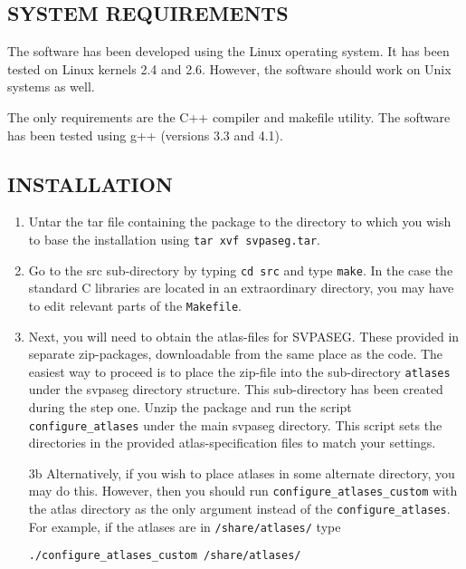 \documentclass[12pt]{article}
\begin{document}
\subsection{SYSTEM REQUIREMENTS}

The software has been developed using the Linux operating system. It has
been tested on Linux kernels 2.4 and 2.6. However, the software should
work on Unix systems as well. 

The only requirements are the C++ compiler and makefile utility. The
software has been tested using g++ (versions 3.3 and 4.1).

\subsection{INSTALLATION}

\begin{enumerate}
\item Untar the tar file containing the package to the directory to which you wish to base the
installation using {\tt tar xvf svpaseg.tar}. 
\item Go to the src sub-directory by typing {\tt cd src} and type {\tt make}. In the case the standard C
libraries are located in an extraordinary directory, you may have to
edit relevant parts of the {\tt Makefile}.
 
\item Next, you will need to obtain the atlas-files for SVPASEG. These provided in separate zip-packages, downloadable from the same place as the code.  The easiest way to proceed is to place the zip-file into the sub-directory {\tt atlases} under the svpaseg directory structure. This sub-directory has been created during the step one. Unzip the package and run the script {\tt configure\_atlases} under the main svpaseg directory. This script sets the directories in the provided atlas-specification files to match your settings.

\item[3b] Alternatively, if you wish to place atlases in some alternate directory, you may do this. However, then you should run {\tt configure\_atlases\_custom} with the atlas directory as the only argument instead of the {\tt configure\_atlases}. For example, if the atlases are in {\tt /share/atlases/} type 
\begin{verbatim}
./configure_atlases_custom /share/atlases/
\end{verbatim}    

\end{enumerate}
\end{document}

